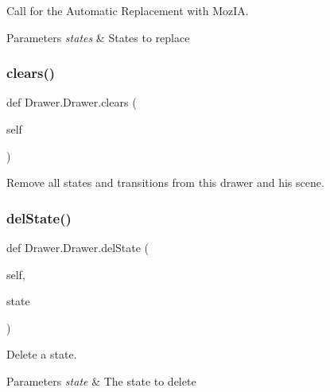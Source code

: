Call for the Automatic Replacement with Moz\+IA. 


\begin{DoxyParams}{Parameters}
{\em states} & States to replace \\
\hline
\end{DoxyParams}
\mbox{\label{classDrawer_1_1Drawer_ac487d0cbf8b206c1a4405a2e1da26526}} 
\subsubsection{\texorpdfstring{clears()}{clears()}}
{\footnotesize\ttfamily def Drawer.\+Drawer.\+clears (\begin{DoxyParamCaption}\item[{}]{self }\end{DoxyParamCaption})}



Remove all states and transitions from this drawer and his scene. 

\mbox{\label{classDrawer_1_1Drawer_ac7bd0a70f3717fd40ff6b9360c1ff51d}} 
\subsubsection{\texorpdfstring{delState()}{delState()}}
{\footnotesize\ttfamily def Drawer.\+Drawer.\+del\+State (\begin{DoxyParamCaption}\item[{}]{self,  }\item[{}]{state }\end{DoxyParamCaption})}



Delete a state. 


\begin{DoxyParams}{Parameters}
{\em state} & The state to delete \\
\hline
\end{DoxyParams}
\mbox{\label{classDrawer_1_1Drawer_a6b36ec97121b8576eef08fb7430882a8}} 
